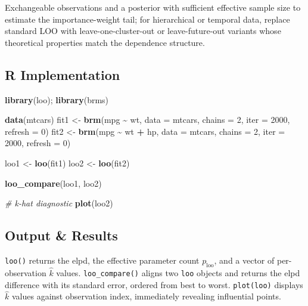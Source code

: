 \documentclass[
]{article}
\newenvironment{Shaded}{\begin{snugshade}}{\end{snugshade}}
\newcommand{\AttributeTok}[1]{\textcolor[rgb]{0.13,0.29,0.53}{#1}}
\newcommand{\CommentTok}[1]{\textcolor[rgb]{0.56,0.35,0.01}{\textit{#1}}}
\newcommand{\DecValTok}[1]{\textcolor[rgb]{0.00,0.00,0.81}{#1}}
\newcommand{\FunctionTok}[1]{\textcolor[rgb]{0.13,0.29,0.53}{\textbf{#1}}}
\newcommand{\NormalTok}[1]{#1}
\newcommand{\OtherTok}[1]{\textcolor[rgb]{0.56,0.35,0.01}{#1}}
\newcommand{\SpecialCharTok}[1]{\textcolor[rgb]{0.81,0.36,0.00}{\textbf{#1}}}
\begin{document}
Exchangeable observations and a posterior with sufficient effective
sample size to estimate the importance-weight tail; for hierarchical or
temporal data, replace standard LOO with leave-one-cluster-out or
leave-future-out variants whose theoretical properties match the
dependence structure.

\subsection{R Implementation}\label{r-implementation}

\begin{Shaded}
\begin{Highlighting}[]
\FunctionTok{library}\NormalTok{(loo); }\FunctionTok{library}\NormalTok{(brms)}

\FunctionTok{data}\NormalTok{(mtcars)}
\NormalTok{fit1 }\OtherTok{\textless{}{-}} \FunctionTok{brm}\NormalTok{(mpg }\SpecialCharTok{\textasciitilde{}}\NormalTok{ wt, }\AttributeTok{data =}\NormalTok{ mtcars, }\AttributeTok{chains =} \DecValTok{2}\NormalTok{, }\AttributeTok{iter =} \DecValTok{2000}\NormalTok{, }\AttributeTok{refresh =} \DecValTok{0}\NormalTok{)}
\NormalTok{fit2 }\OtherTok{\textless{}{-}} \FunctionTok{brm}\NormalTok{(mpg }\SpecialCharTok{\textasciitilde{}}\NormalTok{ wt }\SpecialCharTok{+}\NormalTok{ hp, }\AttributeTok{data =}\NormalTok{ mtcars, }\AttributeTok{chains =} \DecValTok{2}\NormalTok{, }\AttributeTok{iter =} \DecValTok{2000}\NormalTok{, }\AttributeTok{refresh =} \DecValTok{0}\NormalTok{)}

\NormalTok{loo1 }\OtherTok{\textless{}{-}} \FunctionTok{loo}\NormalTok{(fit1)}
\NormalTok{loo2 }\OtherTok{\textless{}{-}} \FunctionTok{loo}\NormalTok{(fit2)}

\FunctionTok{loo\_compare}\NormalTok{(loo1, loo2)}

\CommentTok{\# k{-}hat diagnostic}
\FunctionTok{plot}\NormalTok{(loo2)}
\end{Highlighting}
\end{Shaded}

\subsection{Output \& Results}\label{output-results}

\texttt{loo()} returns the elpd, the effective parameter count
\(p_{\mathrm{loo}}\), and a vector of per-observation \(\hat k\) values.
\texttt{loo\_compare()} aligns two \texttt{loo} objects and returns the
elpd difference with its standard error, ordered from best to worst.
\texttt{plot(loo)} displays \(\hat k\) values against observation index,
immediately revealing influential points.
\end{document}
